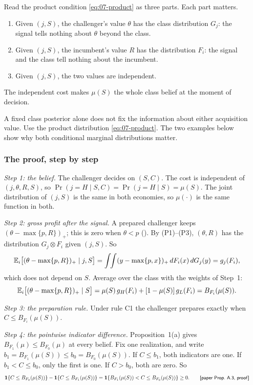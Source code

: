 Read the product condition \eqref{eq:07-product} as three parts. Each part matters.
\begin{enumerate}[label=(P\arabic*),leftmargin=3em]
\item Given \((j,S)\), the challenger's value \(\theta\) has the class distribution \(G_j\): the signal tells nothing about
\(\theta\) beyond the class.
\item Given \((j,S)\), the incumbent's value \(R\) has the distribution \(F_i\): the signal and the class tell nothing about
the incumbent.
\item Given \((j,S)\), the two values are independent.
\end{enumerate}
The independent cost makes \(\mu(S)\) the whole class belief at the moment of decision.

\begin{caution}
A fixed class posterior alone does not fix the information about either acquisition value.
Use the product distribution \eqref{eq:07-product}.
The two examples below show why both conditional marginal distributions matter.
\end{caution}

\subsubsection*{The proof, step by step}

\emph{Step 1: the belief.} The challenger decides on \((S,C)\). The cost is independent of \((j,\theta,R,S)\), so
\(\Pr(j=H\mid S,C)=\Pr(j=H\mid S)=\mu(S)\). The joint distribution of \((j,S)\) is the same in both economies, so
\(\mu(\cdot)\) is the same function in both.

\emph{Step 2: gross profit after the signal.} A prepared challenger keeps \((\theta-\max\{p,R\})_+\); this is zero when
\(\theta<p\) (). By (P1)--(P3), \((\theta,R)\) has the distribution \(G_j\otimes F_i\) given
\((j,S)\). So
\[
\mathbb{E}_i\bigl[(\theta-\max\{p,R\})_+\mid j,S\bigr]=\int\!\!\int(y-\max\{p,x\})_+\,dF_i(x)\,dG_j(y)=g_j(F_i),
\]
which does not depend on \(S\). Average over the class with the weights of Step~1:
\[
\mathbb{E}_i\bigl[(\theta-\max\{p,R\})_+\mid S\bigr]=\mu(S)\,g_H(F_i)+[1-\mu(S)]\,g_L(F_i)=B_{F_i}(\mu(S)).
\]

\emph{Step 3: the preparation rule.} Under rule C1 the challenger prepares exactly when \(C\le B_{F_i}(\mu(S))\).

\emph{Step 4: the pointwise indicator difference.} Proposition~1(a) gives \(B_{F_1}(\mu)\le B_{F_0}(\mu)\) at every
belief. Fix one realization, and write \(b_1=B_{F_1}(\mu(S))\le b_0=B_{F_0}(\mu(S))\). If \(C\le b_1\), both
indicators are one. If \(b_1<C\le b_0\), only the first is one. If \(C>b_0\), both are zero. So
\begin{equation*}
\1\{C\le B_{F_0}(\mu(S))\}-\1\{C\le B_{F_1}(\mu(S))\}=\1\{B_{F_1}(\mu(S))<C\le B_{F_0}(\mu(S))\}\ge0 .
\tag*{\paper{Prop.~A.3, proof}}
\end{equation*}

